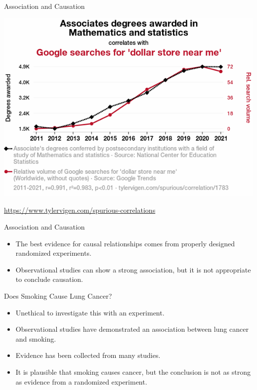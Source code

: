 \documentclass{beamer}
\begin{document}
\begin{frame}{Association and Causation}
    \begin{center}
        \includegraphics[width=.8\linewidth]{figures/1783_associates-degrees-awarded-in-mathematics-and-statistics_correlates-with_google-searches-for-dollar-store-near-me.png}
    \end{center}
    \footnotesize 
    \href{https://www.tylervigen.com/spurious-correlations}{https://www.tylervigen.com/spurious-correlations}
\end{frame}

\begin{frame}{Association and Causation}
    \begin{itemize}
        \item The best evidence for causal relationships comes from properly designed randomized experiments. 
        \item Observational studies can show a strong association, but it is not appropriate to conclude causation.
    \end{itemize}
\end{frame}

\begin{frame}{Does Smoking Cause Lung Cancer?}
    \begin{itemize}
        \item Unethical to investigate this with an experiment.
        \item Observational studies have demonstrated an association between lung cancer and smoking.
        \item Evidence has been collected from many studies.
        \item It is plausible that smoking causes cancer, but the conclusion is not as strong as evidence from a randomized experiment. 
    \end{itemize}
\end{frame}
\end{document}
